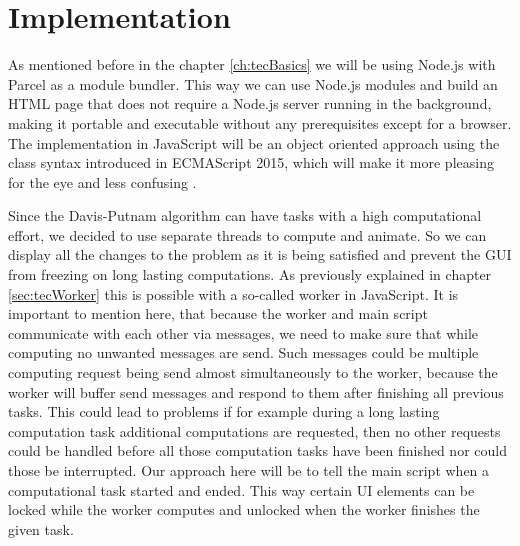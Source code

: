 
\chapter{Implementation}
\label{ch:implementation}
As mentioned before in the chapter \ref{ch:tecBasics} we will be using Node.js with Parcel as a module bundler. This way we can use Node.js modules and build an HTML page that does not require a Node.js server running in the background, making it portable and executable without any prerequisites except for a browser. The implementation in JavaScript will be an object oriented approach using the class syntax introduced in ECMAScript 2015, which will make it more pleasing for the eye and less confusing \cite{MozillaDevelopers2019}.

Since the Davis-Putnam algorithm can have tasks with a high computational effort, we decided to use separate threads to compute and animate. So we can display all the changes to the problem as it is being satisfied and prevent the GUI from freezing on long lasting computations. As previously explained in chapter \ref{sec:tecWorker} this is possible with a so-called worker in JavaScript. It is important to mention here, that because the worker and main script communicate with each other via messages, we need to make sure that while computing no unwanted messages are send. Such messages could be multiple computing request being send almost simultaneously to the worker, because the worker will buffer send messages and respond to them after finishing all previous tasks. This could lead to problems if for example during a long lasting computation task additional computations are requested, then no other requests could be handled before all those computation tasks have been finished nor could those be interrupted. Our approach here will be to tell the main script when a computational task started and ended. This way certain UI elements can be locked while the worker computes and unlocked when the worker finishes the given task.

